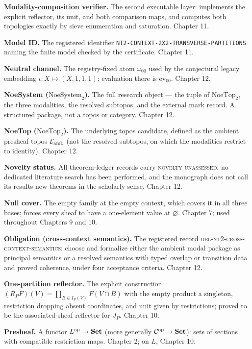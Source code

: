 \textbf{Modality-composition verifier.} The second executable layer:
implements the explicit reflector, its unit, and both comparison
maps, and computes both topologies exactly by sieve enumeration and
saturation. Chapter 11.

\textbf{Model ID.} The registered identifier
\texttt{NT2-CONTEXT-2X2-TRANSVERSE-PARTITIONS} naming the finite
model checked by the certificate. Chapter 11.

\textbf{Neutral channel.} The registry-fixed atom $\omega_{00}$ used
by the conjectural legacy embedding $\iota : X \mapsto (X, 1, 1, 1)$;
evaluation there is $\mathrm{ev}_{00}$. Chapter 12.

\textbf{NoeSystem ($\mathrm{NoeSystem}_2$).} The full research
object --- the tuple of
$\mathrm{NoeTop}_2$, the three modalities, the resolved subtopos, and
the external mark record. A structured package, not a topos or
category. Chapter 12.

\textbf{NoeTop ($\mathrm{NoeTop}_2$).} The underlying topos
candidate, defined as the
ambient presheaf topos $\mathcal{E}_{\mathrm{amb}}$ (not the resolved subtopos, on which
the modalities restrict to identity). Chapter 12.

\textbf{Novelty status.} All theorem-ledger records carry
\textsc{novelty unassessed}: no dedicated literature search has been
performed, and the monograph does not call its results new theorems
in the scholarly sense. Chapter 12.

\textbf{Null cover.} The empty family at the empty context, which
covers it in all three bases; forces every sheaf to have a
one-element value at $\varnothing$. Chapter 7; used throughout
Chapters 9 and 10.

\textbf{Obligation (cross-context semantics).} The registered record
\textsc{obl-nt2-cross-context-semantics}: choose and formalize either
the ambient modal package as principal semantics or a resolved
semantics with typed overlap or transition data and proved coherence,
under four acceptance criteria. Chapter 12.

\textbf{One-partition reflector.} The explicit construction
$(R_P F)(V) = \prod_{B \in I_P(V)} F(V \cap B)$ with the empty
product a singleton, restriction dropping absent coordinates, and
unit given by restrictions; proved to be the associated-sheaf
reflector for $J_P$. Chapter 10.

\textbf{Presheaf.} A functor $L^{\mathrm{op}} \to \mathbf{Set}$ (more
generally $\mathcal{C}^{\mathrm{op}} \to \mathbf{Set}$): sets of sections with
compatible restriction maps. Chapter 2; on $L$, Chapter 10.

